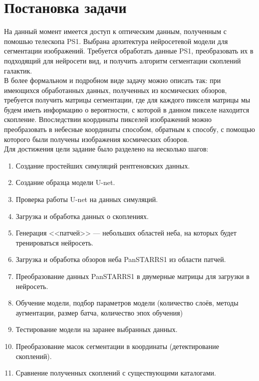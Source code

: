 \chapter{Постановка задачи}
\label{cha:ch_1}
На данный момент имеется доступ к оптическим данным, полученным с помошью телескопа PS1. Выбрана 
архитектура нейросетевой модели для сегментации изображений. Требуется обработать данные PS1, 
преобразовать их в подходящий для нейросети вид, и получить алгоритм сегментации скоплений 
галактик.\\

В более формальном и подробном виде задачу можно описать так: при имеющихся обработанных данных, 
полученных из космических обзоров, требуется получить матрицы сегментации, где для каждого пикселя 
матрицы мы будем иметь информацию о вероятности, с которой в данном пикселе находится скопление. 
Впоследствии координаты пикселей изображений можно преобразовать в небесные координаты способом, 
обратным к способу, с помощью которого были получены изображения космических обзоров.\\

Для достижения цели задание было разделено на несколько шагов:

\begin{enumerate}
    \item Создание простейших симуляций рентгеновских данных.
    \item Создание образца модели U-net.
    \item Проверка работы U-net на данных симуляций.
    \item Загрузка и обработка данных о скоплениях.
    \item Генерация <<патчей>> --- небольших областей неба, на которых будет тренироваться нейросеть.
    \item Загрузка и обработка обзоров неба PanSTARRS1 из области патчей.
    \item Преобразование данных PanSTARRS1 в двумерные матрицы для загрузки в нейросеть.
    \item Обучение модели, подбор параметров модели (количество слоёв, методы аугментации, размер 
        батча, количество эпох обучения)
    \item Тестирование модели на заранее выбранных данных.
    \item Преобразование масок сегментации в координаты (детектирование скоплений).
    \item Сравнение полученных скоплений с существующими каталогами.
\end{enumerate}

